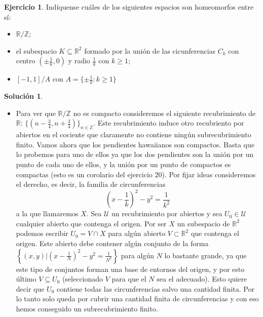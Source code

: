 \documentclass{article}
\theoremstyle{plain}
\theoremstyle{definition}
\newtheorem{exercise}{Ejercicio}
\newtheorem*{sol*}{Solución}
\newcommand{\R}{\mathbb{R}}
\newcommand{\Z}{\mathbb{Z}}
\begin{document}
\newpage
\begin{exercise}
Indíquense cuáles de los siguientes espacios son homeomorfos entre sí:
\begin{itemize}
	\item $\mathbb{R}/\mathbb{Z}$;
	\item el subespacio $K \subseteq \mathbb{R}^2$ formado por la unión de las cicunferencias $C_k$ con centro $(\pm \frac{1}{k},0)$ y radio $\frac{1}{k}$ con $k \geq 1$;
	\item $[-1,1]/A$ con $A = \{ \pm \frac{1}{k} : k \geq 1\}$
\end{itemize}
\end{exercise}
\begin{sol*}
\begin{itemize}
Vamos a probar que los dos últimos espacios son homeomorfos entre sí, pero el primero no es homeomorfo a ellos. Para ello probaremos en primer lugar que $\mathbb{R}/\mathbb{Z}$ no es compacto, mientras que los pendientes hawaiianos (segundo espacio) sí lo son, y por último probaremos la existencia de un homeomorfismo entre los dos espacios finales.
\item  Para ver que $\mathbb{R}/\mathbb{Z}$ no es compacto consideremos el siguiente recubrimiento de $\R$: $\{(n-\frac{3}{4}, n+\frac{3}{4})\}_{n\in\Z}$. Este recubrimiento induce otro recubriento por abiertos en el cociente que claramente no contiene ningún subrecubrimiento finito. Vamos ahora que los pendientes hawaiianos son compactos. Basta que lo probemos para uno de ellos ya que los dos pendientes son la unión por un punto de cada uno de ellos, y la unión por un punto de compactos es compactas (esto es un corolario del ejercicio 20). Por fijar ideas consideremos el derecho, es decir, la familia de circunferencias 
\[\left(x-\frac{1}{k}\right)^2-y^2=\frac{1}{k^2}\]
a la que llamaremos $X$. Sea $\mathcal{U}$ un recubrimiento por abiertos y sea $U_0\in\mathcal{U}$ cualquier abierto que contenga el origen. Por ser $X$ un subespacio de $\R^2$ podemos escribir $U_0=V\cap X$ para algún abierto $V\subset\R^2$ que contenga el origen. Este abierto debe contener algún conjunto de la forma $\left\{(x,y)| \left(x-\frac{1}{N}\right)^2-y^2=\frac{1}{N^2}\right\}$ para algún $N$ lo bastante grande, ya que este tipo de conjuntos forman una base de entornos del origen, y por esto último $V\subseteq U_0$ (seleccionado $V$ para que el $N$ sea el adecuado). Esto quiere decir que $U_0$ contiene todas las circunferencias salvo una cantidad finita. Por lo tanto solo queda por cubrir una cantidad finita de circunferencias y con eso hemos conseguido un subrecubrimiento finito. 

\end{itemize}
\end{sol*}
\end{document}
